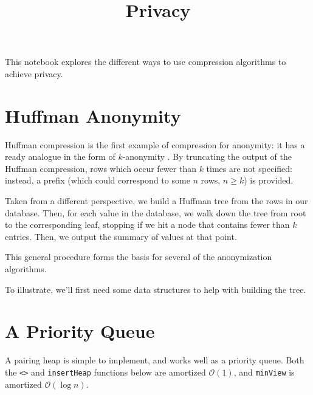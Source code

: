 \documentclass[11pt]{article}
\title{Privacy}
\begin{document}
    
    
    \maketitle
    
    

    
    This notebook explores the different ways to use compression algorithms
to achieve privacy.

    \hypertarget{huffman-anonymity}{%
\section{Huffman Anonymity}\label{huffman-anonymity}}

Huffman compression is the first example of compression for anonymity:
it has a ready analogue in the form of \(k\)-anonymity
\cite{sweeney_k-anonymity:_2002}. By truncating the output of the
Huffman compression, rows which occur fewer than \(k\) times are not
specified: instead, a prefix (which could correspond to some \(n\) rows,
\(n \geq k\)) is provided.

Taken from a different perspective, we build a Huffman tree from the
rows in our database. Then, for each value in the database, we walk down
the tree from root to the corresponding leaf, stopping if we hit a node
that contains fewer than \(k\) entries. Then, we output the summary of
values at that point.

This general procedure forms the basis for several of the anonymization
algorithms.

    To illustrate, we'll first need some data structures to help with
building the tree.

    \hypertarget{a-priority-queue}{%
\section{A Priority Queue}\label{a-priority-queue}}

A pairing heap \cite{fredman_pairing_1986} is simple to implement, and
works well as a priority queue. Both the
\texttt{\textless{}\textgreater{}} and \texttt{insertHeap} functions
below are amortized \(\mathcal{O}(1)\), and \texttt{minView} is
amortized \(\mathcal{O}(\log n)\).
\end{document}
